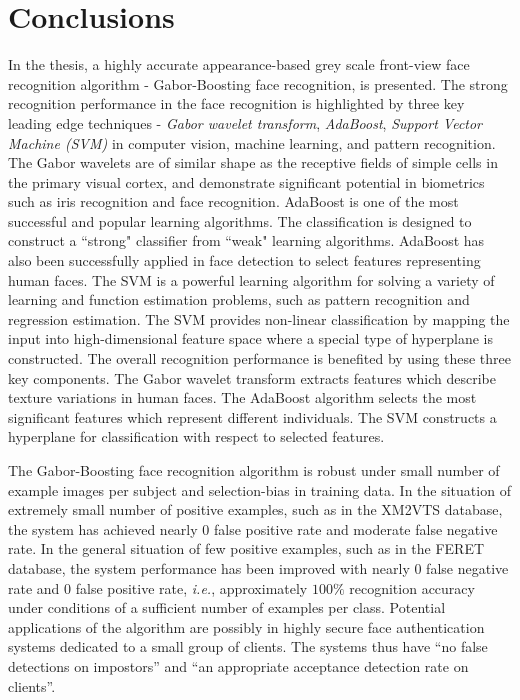 \section{Conclusions}
In the thesis, a highly accurate appearance-based grey scale front-view face recognition algorithm - Gabor-Boosting face recognition, is presented. The strong recognition performance in the face recognition is highlighted by three key leading edge techniques - \textit{Gabor wavelet transform}, \textit{AdaBoost}, \textit{Support Vector Machine (SVM)} in computer vision, machine learning, and pattern recognition. The Gabor wavelets are of similar shape as the receptive fields of simple cells in the primary visual cortex, and demonstrate significant potential in biometrics such as iris recognition and face recognition. AdaBoost is one of the most successful and popular learning algorithms. The classification is designed to construct a ``strong" classifier from ``weak" learning algorithms. AdaBoost has also been successfully applied in face detection to select features representing human faces. The SVM is a powerful learning algorithm for solving a variety of learning and function estimation problems, such as pattern recognition and regression estimation. The SVM provides non-linear classification by mapping the input into high-dimensional feature space where a special type of hyperplane is constructed. The overall recognition performance is benefited by using these three key components. The Gabor wavelet transform extracts features which describe texture variations in human faces. The AdaBoost algorithm selects the most significant features which represent different individuals. The SVM constructs a hyperplane for classification with respect to selected features.

The Gabor-Boosting face recognition algorithm is robust under small number of example images per subject and selection-bias in training data. In the situation of extremely small number of positive examples, such as in the \mbox{XM2VTS} database, the system has achieved nearly $0$ false positive rate and moderate false negative rate. In the general situation of few positive examples, such as in the \mbox{FERET} database, the system performance has been improved with nearly $0$ false negative rate and $0$ false positive rate, \textit{i.e.}, approximately $100\%$ recognition accuracy under conditions of a sufficient number of examples per class.
Potential applications of the algorithm are possibly in highly secure face authentication systems dedicated to a small group of clients. The systems thus have ``no false detections on impostors'' and ``an appropriate acceptance detection rate on clients''. 

